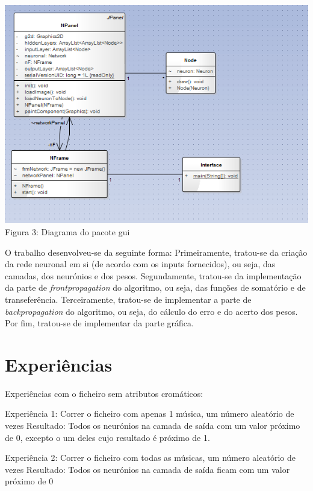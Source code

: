 \documentclass[a4paper]{article}
\begin{document}
\includegraphics[scale=0.5]{gui.png}
\\Figura 3: Diagrama do pacote gui\linebreak\linebreak

O trabalho desenvolveu-se da seguinte forma: \linebreak
Primeiramente, tratou-se da criação da rede neuronal em si (de acordo com os inputs fornecidos), ou seja, das camadas, dos neurónios e dos pesos.\linebreak
Segundamente, tratou-se da implementação da parte de \textit{frontpropagation} do algoritmo, ou seja, das funções de somatório e de transeferência.\linebreak
Terceiramente, tratou-se de implementar a parte de \textit{backpropagation} do algoritmo, ou seja, do cálculo do erro e do acerto dos pesos.\linebreak
Por fim, tratou-se de implementar da parte gráfica.

\section{Experiências}
Experiências com o ficheiro sem atributos cromáticos:

Experiência 1: Correr o ficheiro com apenas 1 música, um número aleatório de vezes
Resultado: Todos os neurónios na camada de saída com um valor próximo de 0, excepto o um deles cujo resultado é próximo de 1.

Experiência 2: Correr o ficheiro com todas as músicas, um número aleatório de vezes
Resultado: Todos os neurónios na camada de saída ficam com um valor próximo de 0
\end{document}
